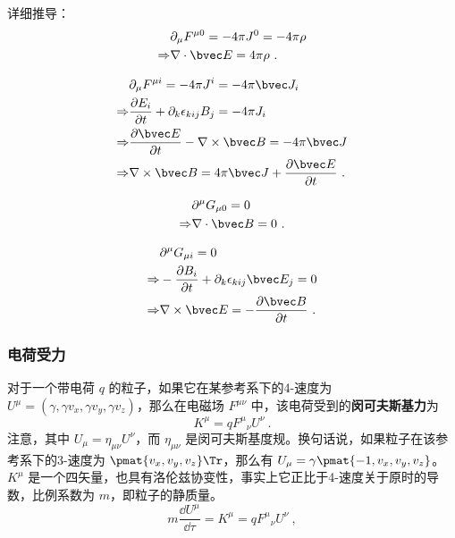 详细推导：
\begin{equation}
\begin{aligned}
&\partial_\mu F^{\mu 0}=-4\pi J^0=-4\pi \rho\\
\Rightarrow &\nabla \cdot \bvec E=4\pi \rho ~.
\end{aligned}
\end{equation}

\begin{equation}
\begin{aligned}
&\partial_\mu F^{\mu i}=-4\pi J^i=-4\pi \bvec J_i\\
\Rightarrow & \frac{\partial E_i}{\partial t} +\partial_k\epsilon_{kij}B_j=-4\pi J_i\\
\Rightarrow &\frac{\partial \bvec E}{\partial t}-\nabla\times \bvec B=-4\pi \bvec J\\
\Rightarrow &\nabla\times \bvec B=4\pi \bvec J+\frac{\partial \bvec E}{\partial t}~.
\end{aligned}
\end{equation}

\begin{equation}
\begin{aligned}
&\partial^\mu G_{\mu 0} = 0\\
\Rightarrow &\nabla \cdot \bvec B = 0~.
\end{aligned}
\end{equation}

\begin{equation}
\begin{aligned}
&\partial^\mu G_{\mu i} = 0\\
\Rightarrow &-\frac{\partial B_i}{\partial t}+\partial_k \epsilon_{kij} \bvec E_j = 0\\
\Rightarrow &\nabla \times \bvec E=-\frac{\partial \bvec B}{\partial t}~.
\end{aligned}
\end{equation}
\subsubsection{电荷受力}

对于一个带电荷 $q$ 的粒子，如果它在某参考系下的4-速度为 $U^\mu=(\gamma,\gamma v_x,\gamma v_y,\gamma v_z)$，那么在电磁场 $F^{\mu\nu}$ 中，该电荷受到的\textbf{闵可夫斯基力}为
\begin{equation}
K^{\mu}=q {F^{\mu}}_\nu U^\nu~.
\end{equation}
注意，其中 $U_\mu=\eta_{\mu\nu}U^\nu$，而 $\eta_{\mu\nu}$ 是闵可夫斯基度规。换句话说，如果粒子在该参考系下的3-速度为 $\pmat{v_x, v_y, v_z}\Tr$，那么有 $U_\mu=\gamma\pmat{-1, v_x, v_y, v_z}$。$K^\mu$ 是一个四矢量，也具有洛伦兹协变性，事实上它正比于4-速度关于原时的导数，比例系数为 $m$，即粒子的静质量。
\begin{equation}\label{eq_EMFT_3}
m\frac{\dd U^\mu}{\dd \tau}=K^\mu=q {F^{\mu}}_\nu U^\nu~,
\end{equation}

